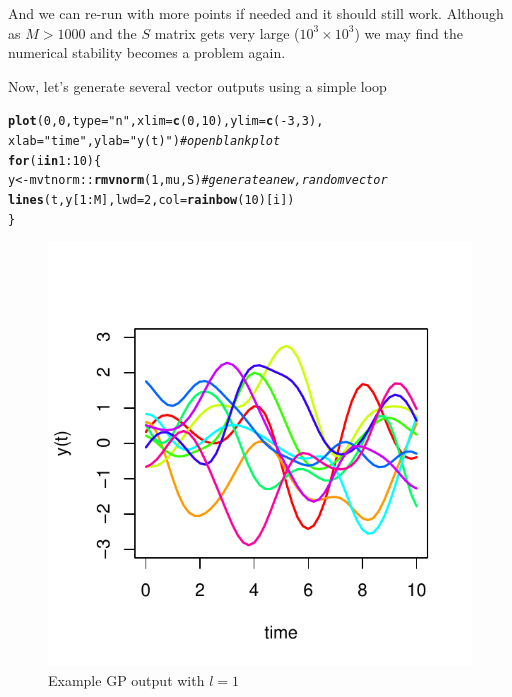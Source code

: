 \documentclass[a4paper,11pt]{article}\usepackage[]{graphicx}\usepackage[]{color}
\makeatletter
\def\maxwidth{ %
  \ifdim\Gin@nat@width>\linewidth
    \linewidth
  \else
    \Gin@nat@width
  \fi
}
\newcommand{\hlnum}[1]{\textcolor[rgb]{0.686,0.059,0.569}{#1}}%
\newcommand{\hlstr}[1]{\textcolor[rgb]{0.192,0.494,0.8}{#1}}%
\newcommand{\hlcom}[1]{\textcolor[rgb]{0.678,0.584,0.686}{\textit{#1}}}%
\newcommand{\hlopt}[1]{\textcolor[rgb]{0,0,0}{#1}}%
\newcommand{\hlstd}[1]{\textcolor[rgb]{0.345,0.345,0.345}{#1}}%
\newcommand{\hlkwa}[1]{\textcolor[rgb]{0.161,0.373,0.58}{\textbf{#1}}}%
\newcommand{\hlkwb}[1]{\textcolor[rgb]{0.69,0.353,0.396}{#1}}%
\newcommand{\hlkwc}[1]{\textcolor[rgb]{0.333,0.667,0.333}{#1}}%
\newcommand{\hlkwd}[1]{\textcolor[rgb]{0.737,0.353,0.396}{\textbf{#1}}}%
\newenvironment{kframe}{%
 \def\at@end@of@kframe{}%
 \ifinner\ifhmode%
  \def\at@end@of@kframe{\end{minipage}}%
  \begin{minipage}{\columnwidth}%
 \fi\fi%
 \def\FrameCommand##1{\hskip\@totalleftmargin \hskip-\fboxsep
 \colorbox{shadecolor}{##1}\hskip-\fboxsep
     \hskip-\linewidth \hskip-\@totalleftmargin \hskip\columnwidth}%
 \MakeFramed {\advance\hsize-\width
   \@totalleftmargin\z@ \linewidth\hsize
   \@setminipage}}%
 {\par\unskip\endMakeFramed%
 \at@end@of@kframe}
\newenvironment{knitrout}{}{} %
\makeatother
\begin{document}
And we can re-run with more points if needed and it should still work. Although as $M>1000$ and the $S$ matrix gets very large ($10^3 \times 10^3$) we may find the numerical stability becomes a problem again.

Now, let's generate several vector outputs using a simple loop

\begin{knitrout}
\color{fgcolor}\begin{kframe}
\begin{alltt}
  \hlkwd{plot}\hlstd{(}\hlnum{0}\hlstd{,} \hlnum{0}\hlstd{,} \hlkwc{type} \hlstd{=} \hlstr{"n"}\hlstd{,} \hlkwc{xlim} \hlstd{=} \hlkwd{c}\hlstd{(}\hlnum{0}\hlstd{,} \hlnum{10}\hlstd{),} \hlkwc{ylim} \hlstd{=} \hlkwd{c}\hlstd{(}\hlopt{-}\hlnum{3}\hlstd{,} \hlnum{3}\hlstd{),}
       \hlkwc{xlab} \hlstd{=} \hlstr{"time"}\hlstd{,} \hlkwc{ylab} \hlstd{=} \hlstr{"y(t)"}\hlstd{)}  \hlcom{# open blank plot}
  \hlkwa{for} \hlstd{(i} \hlkwa{in} \hlnum{1}\hlopt{:}\hlnum{10}\hlstd{) \{}
    \hlstd{y} \hlkwb{<-} \hlstd{mvtnorm}\hlopt{::}\hlkwd{rmvnorm}\hlstd{(}\hlnum{1}\hlstd{, mu, S)}   \hlcom{# generate a new, random vector}
    \hlkwd{lines}\hlstd{(t, y[}\hlnum{1}\hlopt{:}\hlstd{M],} \hlkwc{lwd} \hlstd{=} \hlnum{2}\hlstd{,} \hlkwc{col} \hlstd{=} \hlkwd{rainbow}\hlstd{(}\hlnum{10}\hlstd{)[i])}
  \hlstd{\}}
\end{alltt}
\end{kframe}\begin{figure}

{\centering \includegraphics[width=\maxwidth]{figure/unnamed-chunk-19-1} 

}

\caption[Example GP output with ]{Example GP output with $l=1$}\label{fig:unnamed-chunk-19}
\end{figure}


\end{knitrout}
\end{document}
